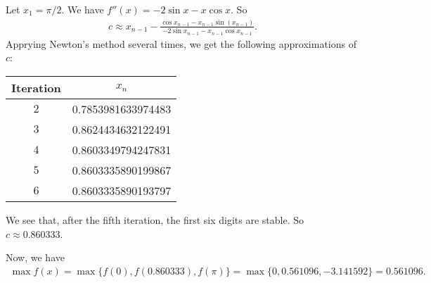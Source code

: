 	Let $x_1 = \pi/2$. We have $f''(x) = -2\sin x - x\cos x$. So
		\begin{align*}
		c \approx x_{n-1} - \frac{\cos x_{n-1} - x_{n-1} \sin (x_{n-1})}{-2 \sin x_{n-1} - x_{n-1} \cos x_{n-1}} .
		\end{align*}
	Apprying Newton's method several times, we get the following approximations of $c$:
	\begin{center}
	\begin{tabular}{c|c}
	Iteration & $x_n$ \\\hline
	$2$ & 0.7853981633974483 \\
	$3$ & 0.8624434632122491 \\
	$4$ & 0.8603349794247831 \\
	$5$ & 0.8603335890199867 \\
	$6$ & 0.8603335890193797
	\end{tabular}
	\end{center}
We see that, after the fifth iteration, the first six digits are stable. So $c \approx 0.860333$.

Now, we have
	\begin{align*}
	\max f(x) = \max \{ f(0) , f(0.860333) , f(\pi ) \} = \max \{ 0 , 0.561096 , -3.141592 \} = 0.561096 .
	\end{align*}
	
